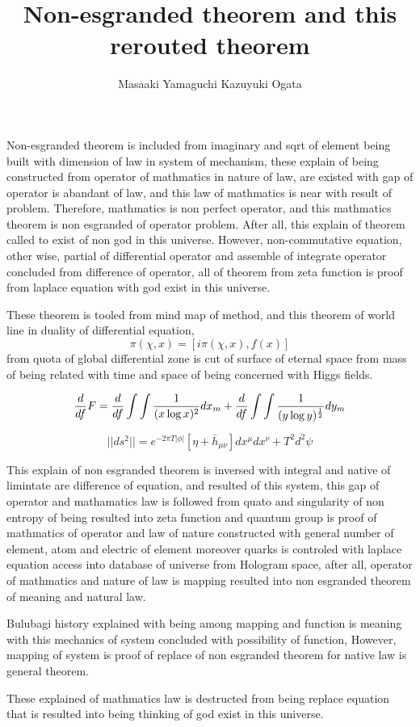 \documentclass{jsarticle}
\begin{document}
\title{Non-esgranded theorem and this rerouted theorem}
\author{Masaaki Yamaguchi  Kazuyuki Ogata}
\date{}
\maketitle

  Non-esgranded theorem is included from imaginary and sqrt of element
being built with dimension of law in system of mechanism,
these explain of being constructed from operator of mathmatics in nature
of law, are existed with gap of operator is abandant of law,
and this law of mathmatics is near with result of problem. Therefore,
mathmatics is non perfect operator, and this mathmatics theorem is
non esgranded of operator problem. After all, this explain of theorem
called to exist of non god in this universe. However, non-commutative
equation, other wise, partial of differential operator and assemble of 
integrate operator concluded from difference of operator, all of theorem
from zeta function is proof from laplace equation with god exist in 
this universe.
 
  These theorem is tooled from mind map of method, and this theorem of 
world line in duality of differential equation,
   $$ \pi(\chi,x) = [i \pi (\chi,x),f(x)] $$
   from quota of global differential zone is 
   cut of surface of eternal space from mass of being
related with time and space of being concerned with Higgs fields.

  $$ {d \over df}F = {d \over df} \int \int{1 \over (x \log x)^2}dx_m
  + {d \over df} \int\int {1 \over (y \log y)^{1 \over2}}dy_m $$

  $$ ||ds^2|| = e^{-2 \pi T |\phi|}[\eta + \bar{h}_{\mu\nu}]dx^{\mu}dx^{\nu}
  + T^2 d^2 \psi $$

  This explain of non esgranded theorem is inversed with integral and native
of limintate are difference of equation, and resulted of this system,
this gap of operator and mathamatics law is followed from quato and 
singularity of non entropy of being resulted into zeta function and quantum
group is proof of mathmatics of operator and law of nature constructed with
general number of element, atom and electric of element moreover quarks
is controled with laplace equation access into database of universe
from Hologram space, after all, operator of mathmatics and nature of law
is mapping resulted into non esgranded theorem of meaning and natural law.

  Bulubagi history explained with being among mapping and function is
meaning with this mechanics of system concluded with possibility of function,
However, mapping of system is proof of replace of non esgranded theorem
for native law is general theorem.
 
  These explained of mathmatics law is destructed from being replace equation
that is resulted into being thinking of god exist in this universe.



 
\end{document}
